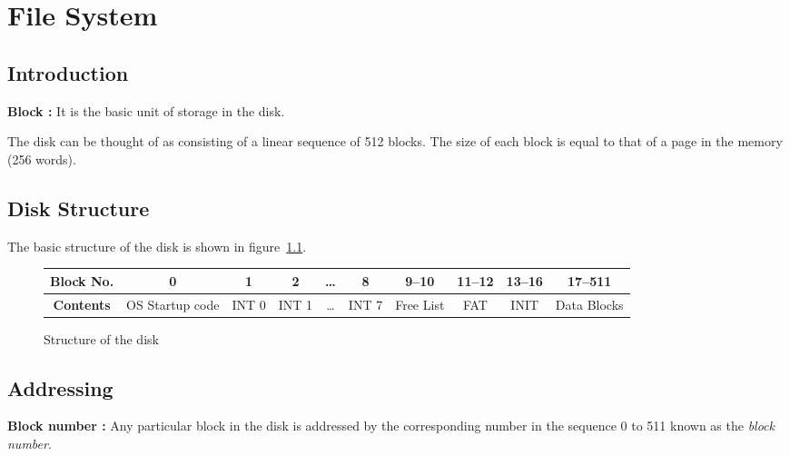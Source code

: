 \chapter{File System}
\label{chp:fs}

\section{Introduction}
\begin{defn}
	\textbf{Block :} It is the basic unit of storage in the disk.
\end{defn}
	
The disk can be thought of as consisting of a linear sequence of 512 blocks.
The size of each block is equal to that of a page in the memory (256 words). 

\section{Disk Structure}
The basic structure of the disk is shown in figure~\ref{fig:disk}.

\begin{figure}[htp!] \small
	\centering
	\begin{tabular}{|c||c|c|c|c|c|c|c|c|c|}
		\hline
		\textbf{Block No.} & 0 & 1 & 2 & \ldots & 8 & 9--10 & 11--12 & 13--16 & 17--511 \\ \hline
		\textbf{Contents} & OS Startup code & INT 0 & INT 1 & \ldots & INT 7 & Free List & FAT & INIT & Data Blocks \\ \hline
	\end{tabular}
	\caption{Structure of the disk}
	\label{fig:disk}
\end{figure}

\section{Addressing}
\begin{defn}	
	\textbf{Block number :} Any particular block in the disk is addressed by the corresponding number in the sequence 0 to 511 known as the \emph{block number}.
\end{defn}

